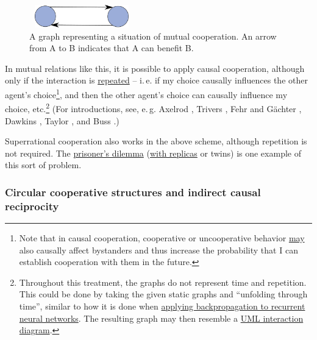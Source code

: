 \begin{figure}[h!]
    \centering
    \includegraphics[width=1.78646in,height=0.38583in]{figs/mutual-cooperation-graph}
    \caption{A graph representing a situation of mutual cooperation. An arrow from A to B indicates
    that A can benefit B.}
    \label{mutual-cooperation-graph}
\end{figure}

In mutual relations like this, it is possible to apply causal
cooperation, although only if the interaction is
\href{https://en.wikipedia.org/wiki/Prisoner\%27s_dilemma\#The_iterated_prisoner.27s_dilemma}{repeated}
-- i.\,e. if my choice causally influences the other agent's
choice\footnote{Note that in causal cooperation, cooperative or
  uncooperative behavior
  \href{https://en.wikipedia.org/wiki/Reciprocity_(evolution)\#Indirect_reciprocity}{may}
  also causally affect bystanders and thus increase the probability that
  I can establish cooperation with them in the future.}, and then the
other agent's choice can causally influence my choice, etc.\footnote{Throughout
  this treatment, the graphs do not represent time and repetition. This
  could be done by taking the given static graphs and ``unfolding
  through time'', similar to how it is done when
  \href{https://en.wikipedia.org/wiki/Backpropagation_through_time}{applying
  backpropagation to recurrent neural networks}. The resulting graph
  may then resemble a
  \href{https://en.wikipedia.org/wiki/Unified_Modeling_Language\#Interaction_diagrams}{UML
  interaction diagram}.} (For introductions, see, e.\,g.
  Axelrod \citeyear{Axelrod2006-ci}, Trivers \citeyear{Trivers1971-rb}, Fehr and Gächter
  \citeyear{Fehr1999-pd}, Dawkins \citeyear{Dawkins1976-cd}, Taylor \citeyear{Taylor1987-wn}, and
  Buss \citeyear{Buss2015-kp}.)

Superrational cooperation also works in the above scheme, although
repetition is not required. The
\href{https://en.wikipedia.org/wiki/Prisoner\%27s_dilemma}{prisoner's
dilemma}
(\href{http://plato.stanford.edu/entries/prisoner-dilemma/\#PDRepCauDecThe}{with
replicas} or twins) is one example of this sort of problem.

\subsubsection{Circular cooperative structures and indirect causal
reciprocity}\label{circular-cooperative-structures-and-indirect-causal-reciprocity}

